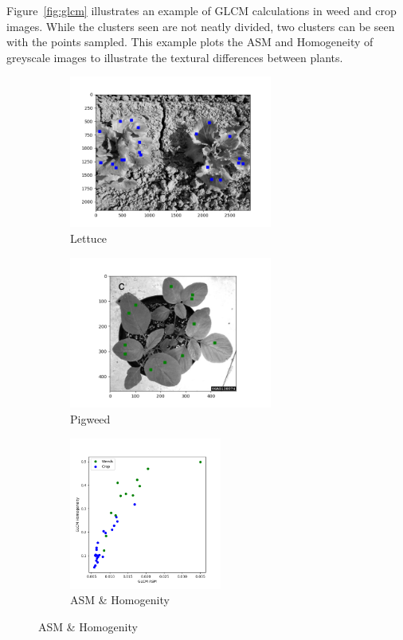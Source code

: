 \documentclass[letterpaper, notitlepage]{report}
\begin{document}
Figure~\ref{fig:glcm} illustrates an example of GLCM calculations in weed and crop images. While the clusters seen are not neatly divided, two clusters can be seen with the points sampled. This example plots the ASM and Homogeneity of greyscale images to illustrate the textural differences between plants.

\begin{figure}[H]
	\begin{subfigure}[h]{0.28\linewidth}
		\includegraphics[height=5cm]{./figures/glcm-crop.png}
		\caption{Lettuce}
		\label{subfig:glcm_crop}	
	\end{subfigure}
	\hfill
	\begin{subfigure}[h]{0.28\linewidth}
		\includegraphics[height=5cm]{./figures/glcm-weed.png}
		\caption{Pigweed}
		\label{subfig:glcm_weed}		
	\end{subfigure}%
	\hfill
	\begin{subfigure}[h]{0.28\linewidth}
		\includegraphics[height=5cm]{./figures/glcm-plot.png}
		\caption{ASM \& Homogenity}
		\label{subfig:glcm_plot}		

\end{subfigure}
\end{figure}
\end{document}
